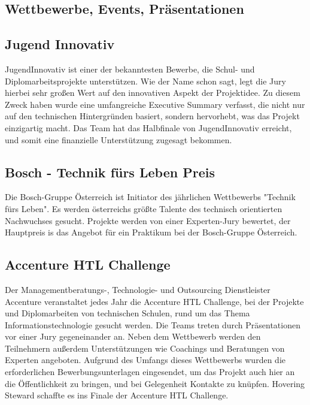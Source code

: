   \subsection{Wettbewerbe, Events, Präsentationen}

    \subsection*{Jugend Innovativ}
    {JugendInnovativ\cite{jugendinnovativ}} ist einer der bekanntesten Bewerbe, die Schul- und Diplomarbeitsprojekte
    unterstützen. Wie der Name schon sagt, legt die Jury hierbei sehr großen Wert auf den innovativen
    Aspekt der Projektidee. Zu diesem Zweck haben wurde eine umfangreiche Executive Summary verfasst, die nicht
    nur auf den technischen Hintergründen basiert, sondern hervorhebt, was das Projekt einzigartig
    macht. Das Team hat das Halbfinale von JugendInnovativ erreicht, und somit eine finanzielle Unterstützung
    zugesagt bekommen.

    \subsection*{Bosch - Technik fürs Leben Preis}
    Die Bosch-Gruppe Österreich ist Initiator des jährlichen Wettbewerbs {"Technik fürs Leben"\cite{bosch}}. Es werden österreichs
    größte Talente des technisch orientierten Nachwuchses gesucht. Projekte werden von einer Experten-Jury bewertet,
    der Hauptpreis is das Angebot für ein Praktikum bei der Bosch-Gruppe Österreich.

    \subsection*{Accenture HTL Challenge}
    Der Managementberatungs-, Technologie- und Outsourcing Dienstleister {Accenture\cite{accenture}} veranstaltet jedes Jahr die Accenture HTL Challenge,
    bei der Projekte und Diplomarbeiten von technischen Schulen, rund um das Thema Informationstechnologie gesucht werden.
    Die Teams treten durch Präsentationen vor einer Jury gegeneinander an. Neben dem Wettbewerb werden den Teilnehmern außerdem
    Unterstützungen wie Coachings und Beratungen von Experten angeboten. Aufgrund des Umfangs dieses Wettbewerbs wurden die erforderlichen Bewerbungsunterlagen eingesendet,
    um das Projekt auch hier an die Öffentlichkeit zu bringen, und bei Gelegenheit Kontakte zu knüpfen. Hovering Steward schaffte es ins Finale der
    Accenture HTL Challenge.

